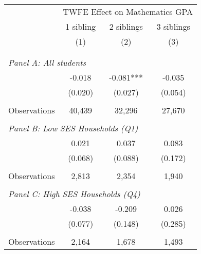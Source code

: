 \makeatletter
{}
{
\makeatother
\begin{tabular}{lccc}
\toprule
\cmidrule(lr){2-4}
& \multicolumn{3}{c}{TWFE Effect on Mathematics GPA} \\
\cmidrule(lr){2-4}
& 1 sibling & 2 siblings & 3 siblings  \\
\cmidrule(lr){2-2} \cmidrule(lr){3-3} \cmidrule(lr){4-4}
& (1) & (2) & (3)\\
\bottomrule
&  &  &  \\
&  &  &   \\
\multicolumn{4}{l}{\textit{Panel A: All students}} \\
\hspace{3mm}        &      -0.018   &      -0.081***&      -0.035   \\
                    &     (0.020)   &     (0.027)   &     (0.054)   \\
                    &               &               &               \\
\hspace{3mm}Observations&      40,439   &      32,296   &      27,670   \\
 
&  &  &   \\
\multicolumn{4}{l}{\textit{Panel B: Low SES Households (Q1)}} \\
\hspace{3mm}        &       0.021   &       0.037   &       0.083   \\
                    &     (0.068)   &     (0.088)   &     (0.172)   \\
                    &               &               &               \\
\hspace{3mm}Observations&       2,813   &       2,354   &       1,940   \\
 
&  &  &   \\
\multicolumn{4}{l}{\textit{Panel C: High SES Households (Q4)}} \\
\hspace{3mm}        &      -0.038   &      -0.209   &       0.026   \\
                    &     (0.077)   &     (0.148)   &     (0.285)   \\
                    &               &               &               \\
\hspace{3mm}Observations&       2,164   &       1,678   &       1,493   \\
 

\end{tabular}}
